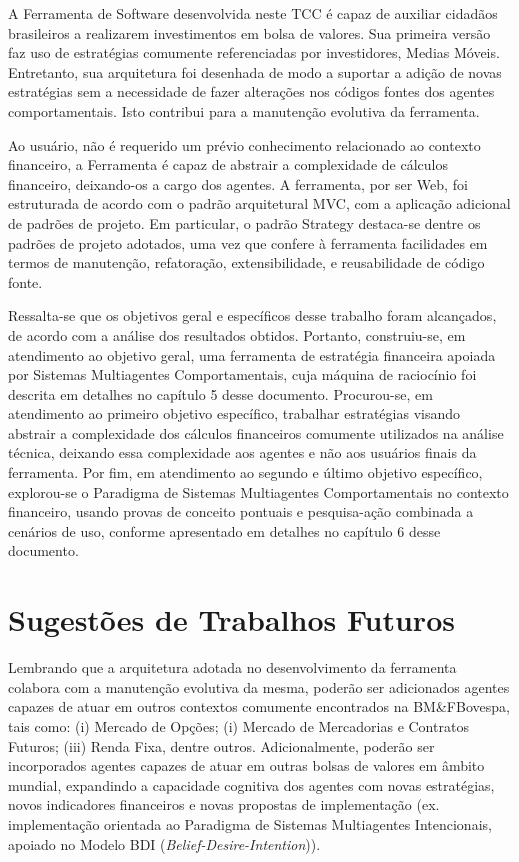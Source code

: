 A Ferramenta de Software desenvolvida neste TCC é capaz de auxiliar cidadãos brasileiros a realizarem investimentos em bolsa de valores. Sua primeira versão faz uso de estratégias comumente referenciadas por investidores, Medias Móveis.  Entretanto, sua arquitetura foi desenhada de modo a suportar a adição de novas estratégias sem a necessidade de fazer alterações nos códigos fontes dos agentes comportamentais. Isto contribui para a manutenção evolutiva da ferramenta.

Ao usuário, não é requerido um prévio conhecimento relacionado ao contexto financeiro, a Ferramenta é capaz de abstrair a complexidade de cálculos financeiro, deixando-os a cargo dos agentes. A ferramenta, por ser Web, foi estruturada de acordo com o padrão arquitetural MVC, com a aplicação adicional de padrões de projeto. Em particular, o padrão Strategy destaca-se dentre os padrões de projeto adotados, uma vez que confere à ferramenta facilidades em termos de manutenção, refatoração, extensibilidade, e reusabilidade de código fonte.

Ressalta-se que os objetivos geral e específicos desse trabalho foram alcançados, de acordo com a análise dos resultados obtidos. Portanto, construiu-se, em atendimento ao objetivo geral, uma ferramenta de estratégia financeira apoiada por Sistemas Multiagentes Comportamentais, cuja máquina de raciocínio foi descrita em detalhes no capítulo 5 desse documento. Procurou-se, em atendimento ao primeiro objetivo específico, trabalhar estratégias visando abstrair a complexidade dos cálculos financeiros comumente utilizados na análise técnica, deixando essa complexidade aos agentes e não aos usuários finais da ferramenta. Por fim, em atendimento ao segundo e último objetivo específico, explorou-se o Paradigma de Sistemas Multiagentes Comportamentais no contexto financeiro, usando provas de conceito pontuais e pesquisa-ação combinada a cenários de uso, conforme apresentado em detalhes no capítulo 6 desse documento.


\section{Sugestões de Trabalhos Futuros}

Lembrando que a arquitetura adotada no desenvolvimento da ferramenta colabora com a manutenção evolutiva da mesma, poderão ser adicionados agentes capazes de atuar em outros contextos comumente encontrados na BM\&FBovespa, tais como: (i) Mercado de Opções; (i) Mercado de Mercadorias e Contratos Futuros; (iii) Renda Fixa, dentre outros. Adicionalmente, poderão ser incorporados agentes capazes de atuar em outras bolsas de valores em âmbito mundial, expandindo a capacidade cognitiva dos agentes com novas estratégias, novos indicadores financeiros e novas propostas de implementação (ex. implementação orientada ao Paradigma de Sistemas Multiagentes Intencionais, apoiado no Modelo BDI (\textit{Belief-Desire-Intention})).

